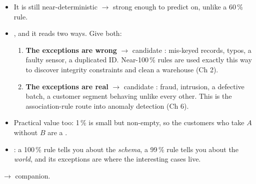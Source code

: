 {\begin{itemize}
  \item It is still near-deterministic $\rightarrow$ strong enough to predict on, unlike a 60\,\%
        rule.
  \item {}, and it reads two ways. Give both:
  \begin{enumerate}
    \item \textbf{The exceptions are wrong} $\rightarrow$ candidate :
          mis-keyed records, typos, a faulty sensor, a duplicated ID. Near-100\,\% rules are used
          exactly this way to discover integrity constraints and clean a warehouse (Ch 2).
    \item \textbf{The exceptions are real} $\rightarrow$ candidate : fraud, intrusion,
          a defective batch, a customer segment behaving unlike every other. This is the
          association-rule route into anomaly detection (Ch 6).
  \end{enumerate}
  \item Practical value too: 1\,\% is small but non-empty, so the customers who take $A$ without
        $B$ are a .
  \item {}: a 100\,\% rule tells you about the \emph{schema},
        a 99\,\% rule tells you about the \emph{world}, and its exceptions are where the
        interesting cases live.
\end{itemize}}

\hr


{\color{sub}\footnotesize {} 
\gap {} $\rightarrow$ companion.}

